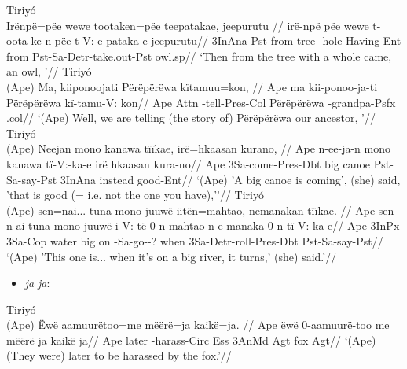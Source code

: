 \documentclass[10pt]{article}
\begin{document}
\pex\label{}    \a Tiriyó\\
    \label{dados-07-frog-story-marciano-p-091-047}        \begingl
        \glpreamble Irënpë=pëe       wewe   tootaken=pëe                teepatakae,                   jeepurutu //
        \gla irë-npë pëe wewe t-oota-ke-n pëe t-V:-e-pataka-e jeepurutu//
        \glb 3InAna-Pst from tree -hole-Having-Ent from Pst-Sa-Detr-take.out-Pst owl.sp//
            \glft ‘Then from the tree with a whole came, an owl,  ’//  
        \endgl 
    \a Tiriyó\\
    \label{dados-09-kereramake-p-033-075}        \begingl
        \glpreamble (Ape) Ma,  kiiponoojati            Përëpërëwa    kïtamuu=kon, //
        \gla Ape ma kii-ponoo-ja-ti Përëpërëwa kï-tamu-V: kon//
        \glb Ape Attn -tell-Pres-Col Përëpërëwa -grandpa-Psfx .col//
            \glft ‘(Ape) Well, we are telling (the story of) Përëpërëwa our ancestor,  ’//  
        \endgl 
    \a Tiriyó\\
    \label{dados-09-kereramake-p-041-269}        \begingl
        \glpreamble (Ape) Neejan               mono   kanawa   tïïkae,             irë=hkaasan    kurano, //
        \gla Ape n-ee-ja-n mono kanawa tï-V:-ka-e irë hkaasan kura-no//
        \glb Ape 3Sa-come-Pres-Dbt big canoe Pst-Sa-say-Pst 3InAna instead good-Ent//
            \glft ‘(Ape) 'A big canoe is coming', (she) said, 'that is good (= i.e. not the one you have),'’//  
        \endgl 
    \a Tiriyó\\
    \label{dados-09-kereramake-p-041-270}        \begingl
        \glpreamble (Ape) sen=nai...     tuna  mono  juuwë  iitën=mahtao,                  nemanakan                    tïïkae. //
        \gla Ape sen n-ai tuna mono juuwë i-V:-të-0-n mahtao n-e-manaka-0-n tï-V:-ka-e//
        \glb Ape 3InPx 3Sa-Cop water big on -Sa-go--? when 3Sa-Detr-roll-Pres-Dbt Pst-Sa-say-Pst//
            \glft ‘(Ape) 'This one is... when it's on a big river, it turns,' (she) said.’//  
        \endgl 
\xe

\begin{itemize}
\tightlist
\item
   \emph{ja}  \emph{ja}:
\end{itemize}

\ex Tiriyó \\
\label{dados-09-kereramake-p-045-323}    \begingl
    \glpreamble (Ape) Ëwë   aamuurëtoo=me           mëërë=ja   kaikë=ja. //
    \gla Ape ëwë 0-aamuurë-too me mëërë ja kaikë ja//
    \glb Ape later -harass-Circ Ess 3AnMd Agt fox Agt//
        \glft ‘(Ape) (They were) later to be harassed by the fox.’//  
    \endgl 
\xe

\printbibliography
\end{document}
